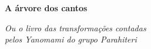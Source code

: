 

\begingroup\thispagestyle{empty}\vspace*{.05\textheight} 

              \formular
              \huge
              \noindent
              \textbf{A árvore dos cantos}
              
              \vspace{0.3em}

              \noindent\normalsize\textit{Ou o livro das transformações contadas\\pelos Yanomami do  grupo Parahiteri}
                    
\endgroup
\vfill
\pagebreak